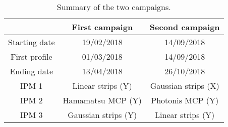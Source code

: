 \begin{table}[!h]
  \centering
  \caption[Summary of the two campaigns]{Summary of the two campaigns.}
  \label{chap4:IPHI_campaign}
  \begin{tabular}{ccc}
    \toprule
                  & First campaign      & Second campaign     \\
    \midrule
    Starting date & 19/02/2018          & 14/09/2018          \\
    First profile & 01/03/2018          & 14/09/2018          \\
    Ending date   & 13/04/2018          & 26/10/2018          \\
    IPM 1         & Linear strips (Y)   & Gaussian strips (X) \\
    IPM 2         & Hamamatsu MCP (Y)   & Photonis MCP (Y)    \\
    IPM 3         & Gaussian strips (Y) & Linear strips (Y)   \\
    \bottomrule
  \end{tabular}
\end{table}